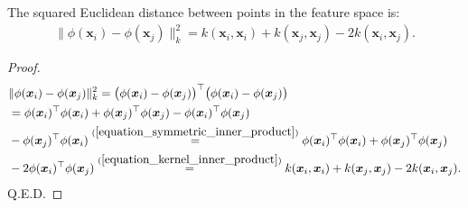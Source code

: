 \documentclass[lang=cn,10pt]{gorgeousnbook}
\numberwithin{equation}{section}%
\numberwithin{figure}{section}%
\begin{document}
\begin{lemma}\label{lemma_distance_in_RKHS}
The squared Euclidean distance between points in the feature space is:
\begin{align}\label{equation_distance_in_RKHS}
\|\phi(\boldsymbol{x}_i) - \phi(\boldsymbol{x}_j)\|_k^2 = k(\boldsymbol{x}_i, \boldsymbol{x}_i) + k(\boldsymbol{x}_j, \boldsymbol{x}_j) - 2 k(\boldsymbol{x}_i, \boldsymbol{x}_j).
\end{align}
\end{lemma}
\begin{proof}
\begin{align*}
&\|\phi(\boldsymbol{x}_i) - \phi(\boldsymbol{x}_j)\|_k^2 = \big( \phi(\boldsymbol{x}_i) - \phi(\boldsymbol{x}_j) \big)^\top \big( \phi(\boldsymbol{x}_i) - \phi(\boldsymbol{x}_j) \big) \\
&= \phi(\boldsymbol{x}_i)^\top \phi(\boldsymbol{x}_i) + \phi(\boldsymbol{x}_j)^\top \phi(\boldsymbol{x}_j) -  \phi(\boldsymbol{x}_i)^\top \phi(\boldsymbol{x}_j) \\
&- \phi(\boldsymbol{x}_j)^\top \phi(\boldsymbol{x}_i) \overset{(\ref{equation_symmetric_inner_product})}{=} \phi(\boldsymbol{x}_i)^\top \phi(\boldsymbol{x}_i) + \phi(\boldsymbol{x}_j)^\top \phi(\boldsymbol{x}_j) \\
&- 2\phi(\boldsymbol{x}_i)^\top \phi(\boldsymbol{x}_j) \overset{(\ref{equation_kernel_inner_product})}{=} k(\boldsymbol{x}_i, \boldsymbol{x}_i) + k(\boldsymbol{x}_j, \boldsymbol{x}_j) - 2 k(\boldsymbol{x}_i, \boldsymbol{x}_j).
\end{align*}
Q.E.D.
\end{proof}
\end{document}
